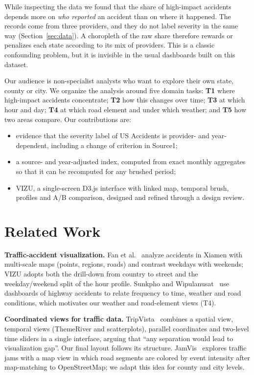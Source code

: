\documentclass[conference]{IEEEtran}
\begin{document}
While inspecting the data we found that the share of high-impact accidents depends more on \emph{who reported} an accident than on where it happened. The records come from three providers, and they do not label severity in the same way (Section~\ref{sec:data}). A choropleth of the raw share therefore rewards or penalizes each state according to its mix of providers. This is a classic confounding problem, but it is invisible in the usual dashboards built on this dataset.

Our audience is non-specialist analysts who want to explore their own state, county or city. We organize the analysis around five domain tasks: \textbf{T1} where high-impact accidents concentrate; \textbf{T2} how this changes over time; \textbf{T3} at which hour and day; \textbf{T4} at which road element and under which weather; and \textbf{T5} how two areas compare. Our contributions are:
\begin{itemize}
\item evidence that the severity label of US Accidents is provider- and year-dependent, including a change of criterion in Source1;
\item a source- and year-adjusted index, computed from exact monthly aggregates so that it can be recomputed for any brushed period;
\item VIZU, a single-screen D3.js interface with linked map, temporal brush, profiles and A/B comparison, designed and refined through a design review.
\end{itemize}

\section{Related Work}

\textbf{Traffic-accident visualization.} Fan et al.~\cite{fan2015bigdata} analyze accidents in Xiamen with multi-scale maps (points, regions, roads) and contrast weekdays with weekends; VIZU adopts both the drill-down from country to street and the weekday/weekend split of the hour profile. Sunkpho and Wipulanusat~\cite{sunkpho2020highway} use dashboards of highway accidents to relate frequency to time, weather and road conditions, which motivates our weather and road-element views (T4).

\textbf{Coordinated views for traffic data.} TripVista~\cite{guo2011tripvista} combines a spatial view, temporal views (ThemeRiver and scatterplots), parallel coordinates and two-level time sliders in a single interface, arguing that ``any separation would lead to visualization gap''. Our final layout follows its structure. JamVis~\cite{rodriguez2022jamvis} explores traffic jams with a map view in which road segments are colored by event intensity after map-matching to OpenStreetMap; we adapt this idea for county and city levels.
\end{document}
